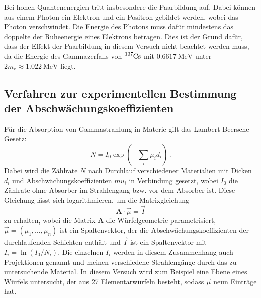 Bei hohen Quantenenergien tritt insbesondere die Paarbildung auf. Dabei können aus
einem Photon ein Elektron und ein Positron gebildet werden, wobei das
Photon verschwindet. Die Energie des Photons muss dafür mindestens das doppelte
der Ruheenergie eines Elektrons betragen. Dies ist der Grund dafür, dass der Effekt der Paarbildung in diesem Versuch nicht beachtet werden muss, da die Energie des Gammazerfalls von $\ce{^{137}Cs}$ mit $\SI{0.6617}{\mega\electronvolt}$ unter $2m_\text{e} \approx \SI{1.022}{\mega\electronvolt}$ liegt.

%

\subsection{Verfahren zur experimentellen Bestimmung der Abschwächungskoeffizienten}

Für die Absorption von Gammastrahlung in Materie gilt das Lambert-Beersche-Gesetz:
\begin{equation}
	N = I_0 \exp(-\sum_i \mu_i d_i)\,.
	\label{eqn:lambertBeer}
\end{equation}
Dabei wird die Zählrate $N$ nach Durchlauf verschiedener Materialien mit Dicken $d_i$ und Abschwächungskoeffizienten $mu_i$ in Verbindung gesetzt, wobei $I_0$ die Zählrate ohne Absorber im Strahlengang bzw. vor dem Absorber ist.
Diese Gleichung lässt sich logarithmieren, um die Matrixgleichung
\begin{equation}
	\symbf{A} \cdot \vec{\mu} = \vec{I}
\end{equation}
zu erhalten, wobei die Matrix $\symbf{A}$ die Würfelgeometrie parametrisiert, $\vec{\mu} = (\mu_1, \dots, \mu_n)$ ist ein Spaltenvektor, der die Abschwächungskoeffizienten der durchlaufenden Schichten enthält und $\vec{I}$ ist ein Spaltenvektor mit $I_i = \ln(I_0/N_i)$. Die einzelnen $I_i$ werden in diesem Zusammenhang auch Projektionen genannt und meinen verschiedene Strahlengänge durch das zu untersuchende Material. In diesem Versuch wird zum Beispiel eine Ebene eines Würfels untersucht, der aus 27 Elementarwürfeln besteht, sodass $\vec{\mu}$ neun Einträge hat.

